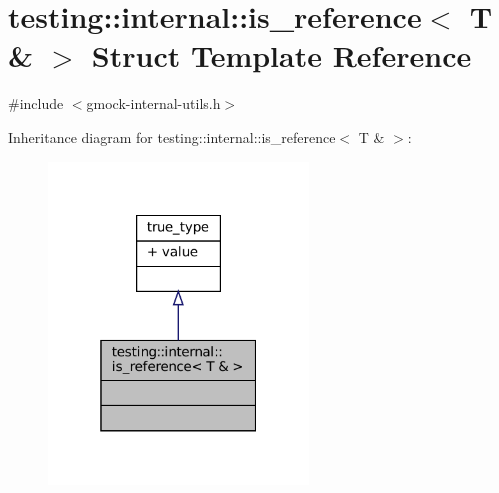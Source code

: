 \hypertarget{structtesting_1_1internal_1_1is__reference_3_01T_01_6_01_4}{}\section{testing\+:\+:internal\+:\+:is\+\_\+reference$<$ T \& $>$ Struct Template Reference}
\label{structtesting_1_1internal_1_1is__reference_3_01T_01_6_01_4}


{\ttfamily \#include $<$gmock-\/internal-\/utils.\+h$>$}



Inheritance diagram for testing\+:\+:internal\+:\+:is\+\_\+reference$<$ T \& $>$\+:
\nopagebreak
\begin{figure}[H]
\begin{center}
\leavevmode
\includegraphics[width=196pt]{structtesting_1_1internal_1_1is__reference_3_01T_01_6_01_4__inherit__graph}
\end{center}
\end{figure}


